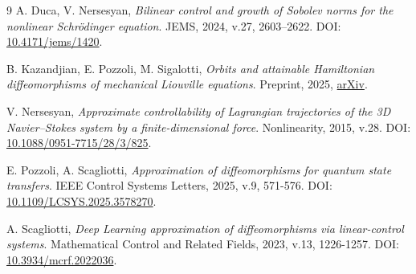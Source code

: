 \documentclass[10pt]{article}
\begin{document}
\begin{thebibliography}{9}
 A. Duca, V. Nersesyan, {\it Bilinear control and growth of Sobolev norms for the
nonlinear Schrödinger equation}. JEMS, 2024, v.27, 2603–2622. DOI: \href{https://doi.org/10.4171/jems/1420}{10.4171/jems/1420}.

 B. Kazandjian, E. Pozzoli, M. Sigalotti, {\it Orbits and attainable Hamiltonian diffeomorphisms of mechanical Liouville equations}. Preprint, 2025, \href{https://arxiv.org/abs/2509.24960}{arXiv}. 

 V. Nersesyan, {\it Approximate controllability of Lagrangian trajectories of the 3D Navier–Stokes system by a finite-dimensional force}. Nonlinearity, 2015, v.28. DOI: \href{https://iopscience.iop.org/article/10.1088/0951-7715/28/3/825}{10.1088/0951-7715/28/3/825}.

 E. Pozzoli, A. Scagliotti, {\it Approximation of diffeomorphisms for quantum state transfers}. IEEE Control Systems Letters, 2025, v.9, 571-576. DOI: \href{https://doi.org/10.1109/LCSYS.2025.3578270}{10.1109/LCSYS.2025.3578270}.

 A. Scagliotti, {\it Deep Learning approximation of diffeomorphisms via linear-control systems}.  Mathematical Control and Related Fields, 2023, v.13, 1226-1257. DOI: \href{https://doi.org/10.3934/mcrf.2022036}{10.3934/mcrf.2022036}.


\end{thebibliography}
\end{document}
